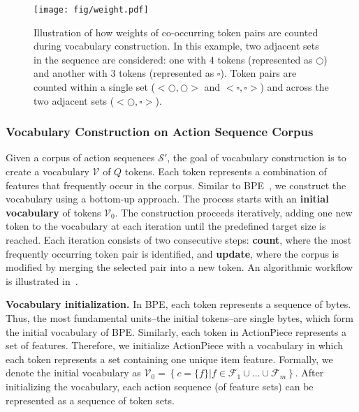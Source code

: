 \begin{figure*}[t]
\begin{center}
\centerline{\texttt{[image: fig/weight.pdf]}}
\end{center}
\vskip -0.5in
\caption{Illustration of how weights of co-occurring token pairs are counted during vocabulary construction. In this example, two adjacent sets in the sequence are considered: one with $4$ tokens (represented as $\bigcirc$) and another with $3$ tokens (represented as $\square$). Token pairs are counted within a single set ($<\bigcirc, \bigcirc>$ and $<\square, \square>$) and across the two adjacent sets ($<\bigcirc, \square>$).}
\label{fig:weight}
\vskip -0.1in
\end{figure*}


\subsubsection{Vocabulary Construction on Action Sequence Corpus}\label{subsubsec:vocab_construct}

Given a corpus of action sequences $\mathcal{S}'$, the goal of vocabulary construction is to create a vocabulary $\mathcal{V}$ of $Q$ tokens. Each token represents a combination of features that frequently occur in the corpus. Similar to BPE~\cite{sennrich2016bpe}, we construct the vocabulary using a bottom-up approach. The process starts with an \textbf{initial vocabulary} of tokens $\mathcal{V}_0$. The construction proceeds iteratively, adding one new token to the vocabulary at each iteration until the predefined target size is reached. Each iteration consists of two consecutive steps: \textbf{count}, where the most frequently occurring token pair is identified, and \textbf{update}, where the corpus is modified by merging the selected pair into a new token. An algorithmic  workflow is illustrated in~.


\textbf{Vocabulary initialization.} In BPE, each token represents a sequence of bytes. Thus, the most fundamental units--the initial tokens--are single bytes, which form the initial vocabulary of BPE. Similarly, each token in ActionPiece represents a set of features. Therefore, we initialize ActionPiece with a vocabulary in which each token represents a set containing one unique item feature. Formally, we denote the initial vocabulary as $\mathcal{V}_{0} = \left\{c = \{f\} | f \in \mathcal{F}_1 \cup \ldots \cup \mathcal{F}_m\right\}$. After initializing the vocabulary, each action sequence (of feature sets) can be represented as a sequence of token sets.

